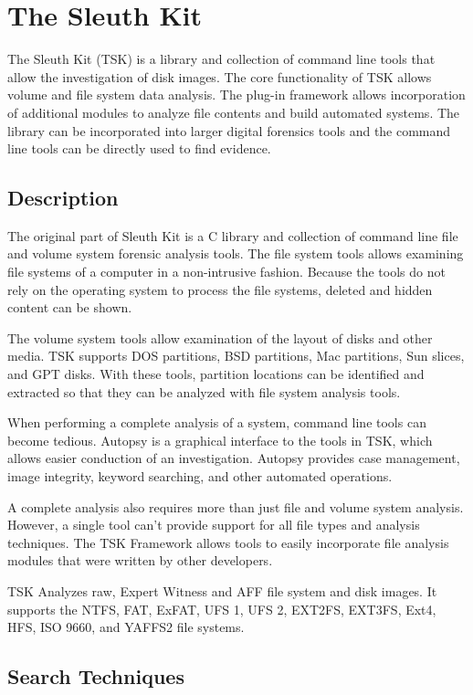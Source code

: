 \section{The Sleuth Kit}

The Sleuth Kit (TSK) is a library and collection of command line tools that allow the
investigation of disk images. The core functionality of TSK allows volume and file system data analysis.
The plug-in framework allows incorporation of additional modules to analyze file contents
and build automated systems. The library can be incorporated into larger digital forensics tools and
the command line tools can be directly used to find evidence.

\subsection{Description}

The original part of Sleuth Kit is a C library and collection of command line
file and volume system forensic analysis tools. The file system tools allows examining file systems
of a computer in a non-intrusive fashion. Because the tools do not rely on the operating system to process
the file systems, deleted and hidden content can be shown.

The volume system tools allow examination of the layout of disks
and other media. TSK supports DOS partitions, BSD partitions, Mac partitions, Sun slices, and 
GPT disks. With these tools, partition locations can be identified 
and extracted so that they can be analyzed with file system analysis tools.

When performing a complete analysis of a system, command line 
tools can become tedious. Autopsy is a graphical interface to the tools in TSK, 
which allows easier conduction of an investigation. Autopsy 
provides case management, image integrity, keyword searching, and other automated
operations.

A complete analysis also requires more than just file and volume system analysis.
However, a single tool can't provide support for all file types and analysis 
techniques. The TSK Framework allows tools to easily incorporate file analysis
modules that were written by other developers.

TSK Analyzes raw, Expert Witness and AFF file system and disk images.
It supports the NTFS, FAT, ExFAT, UFS 1, UFS 2, EXT2FS, EXT3FS, Ext4, HFS, ISO 9660,
and YAFFS2 file systems.

\subsection{Search Techniques}

